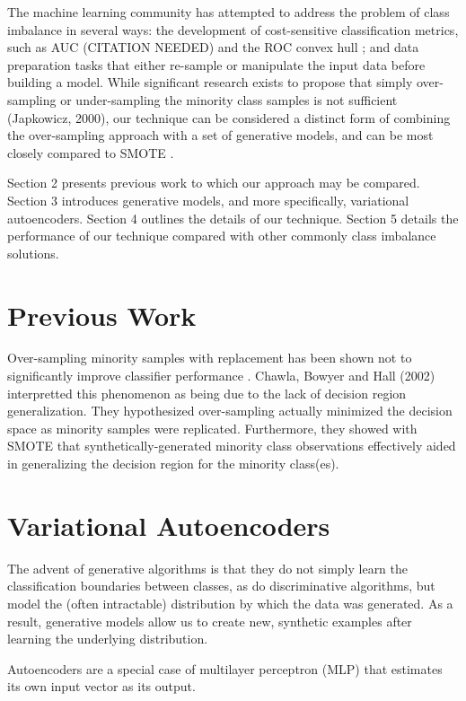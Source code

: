 \documentclass[twoside,11pt]{article}
\begin{document}
The machine learning community has attempted to address the problem of class imbalance in several ways: the development of cost-sensitive classification metrics, such as AUC (CITATION NEEDED) and the ROC convex hull \citep{provost2001robust}; and data preparation tasks that either re-sample or manipulate the input data before building a model. While significant research exists to propose that simply over-sampling or under-sampling the minority class samples is not sufficient (Japkowicz, 2000), our technique can be considered a distinct form of combining the over-sampling approach with a set of generative models, and can be most closely compared to SMOTE \citep{chawla2002smote}.

Section 2 presents previous work to which our approach may be compared. Section 3 introduces generative models, and more specifically, variational autoencoders. Section 4 outlines the details of our technique. Section 5 details the performance of our technique compared with other commonly class imbalance solutions. \\

\section{Previous Work}

Over-sampling minority samples with replacement has been shown not to significantly improve classifier performance \citep{japkowicz2000learning}.  Chawla, Bowyer and Hall (2002) interpretted this phenomenon as being due to the lack of decision region generalization. They hypothesized over-sampling actually minimized the decision space as minority samples were replicated. Furthermore, they showed with SMOTE that synthetically-generated minority class observations effectively aided in generalizing the decision region for the minority class(es).

\section{Variational Autoencoders}

The advent of generative algorithms is that they do not simply learn the classification boundaries between classes, as do discriminative algorithms, but model the (often intractable) distribution by which the data was generated. As a result, generative models allow us to create new, synthetic examples after learning the underlying distribution. 

Autoencoders are a special case of multilayer perceptron (MLP) that estimates its own input vector as its output. 
\end{document}
